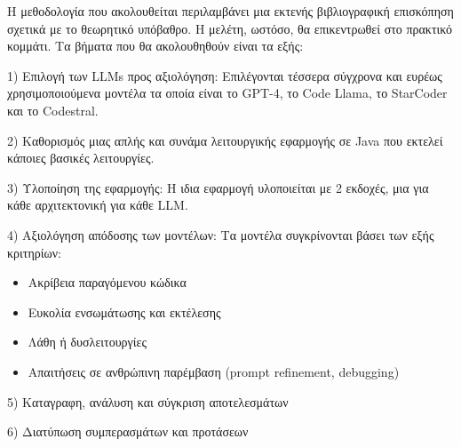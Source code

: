 Η μεθοδολογία που ακολουθείται περιλαμβάνει μια εκτενής βιβλιογραφική επισκόπηση σχετικά με το θεωρητικό υπόβαθρο. Η μελέτη, ωστόσο, θα επικεντρωθεί στο πρακτικό κομμάτι. Τα βήματα που θα ακολουθηθούν είναι τα εξής:

1) Επιλογή των LLMs προς αξιολόγηση: Επιλέγονται τέσσερα σύγχρονα και ευρέως χρησιμοποιούμενα μοντέλα τα οποία είναι το GPT-4, το Code Llama, το StarCoder και το Codestral.

2) Καθορισμός μιας απλής και συνάμα λειτουργικής εφαρμογής σε Java που εκτελεί κάποιες βασικές λειτουργίες.

3) Υλοποίηση της εφαρμογής: Η ιδια εφαρμογή υλοποιείται με 2 εκδοχές, μια για κάθε αρχιτεκτονική για κάθε LLM.

4) Αξιολόγηση απόδοσης των μοντέλων: 
Τα μοντέλα συγκρίνονται βάσει των εξής κριτηρίων:

\begin{itemize}
    \item Ακρίβεια παραγόμενου κώδικα
    \item Ευκολία ενσωμάτωσης και εκτέλεσης
    \item Λάθη ή δυσλειτουργίες
    \item Απαιτήσεις σε ανθρώπινη παρέμβαση (prompt refinement, debugging)
\end{itemize}

5) Καταγραφη, ανάλυση και σύγκριση αποτελεσμάτων

6) Διατύπωση συμπερασμάτων και προτάσεων
